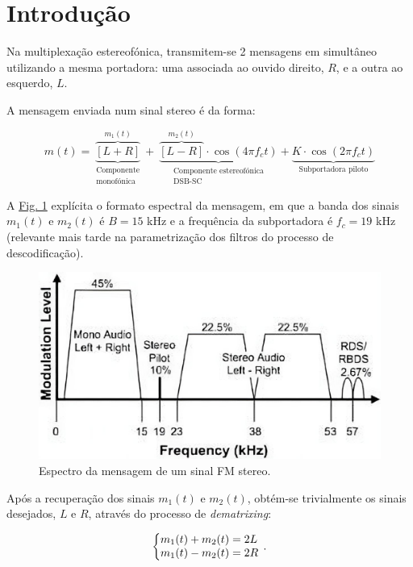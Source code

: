 \newpage
\section{Introdução}
Na multiplexaç\~ao estereofónica, transmitem-se 2 mensagens em simultâneo utilizando a mesma portadora: uma associada ao ouvido direito, $R$, e a outra ao esquerdo, $L$.

A mensagem enviada num sinal stereo é da forma:

\begin{equation*}
    m(t)=\underbrace{\overbrace{[L+R]}^{\text{$m_1(t)$}}}_{\substack{\text{Componente}\\ \text{monofónica}}}+\ \underbrace{\overbrace{[L-R]}^{m_2(t)}\cdot\cos{(4\pi f_c t)}}_{\substack{\text{Componente estereofónica}\\ \text{DSB-SC}}} + \underbrace{K\cdot\cos{(2\pi f_c t)}}_{\text{Subportadora piloto}}
\end{equation*}

A {\hyperref[fig:stereo_spectrum]{Fig. 1}} explícita o formato espectral da mensagem, em que a banda dos sinais $m_1(t)$ e $m_2(t)$ é $B=15$ kHz e a frequência da subportadora é $f_c=19$ kHz (relevante mais tarde na parametrizaç\~ao dos filtros do processo de descodificaç\~ao).

\begin{figure}[H]
    \centering
    \includegraphics[width = 0.6\linewidth]{img/mpx_signal_spectrum.jpeg}
    \caption{Espectro da mensagem de um sinal FM stereo.}
    \label{fig:stereo_spectrum}
\end{figure}

Após a recuperaç\~ao dos sinais $m_1(t)$ e $m_2(t)$, obtém-se trivialmente os sinais desejados, $L$ e $R$, através do processo de \textit{dematrixing}:

\begin{equation*}
  \left\{\begin{array}{@{}l@{}}
    m_1(t)+m_2(t)=2L\\
    m_1(t)-m_2(t)=2R
  \end{array}\right.\,.
\end{equation*}

